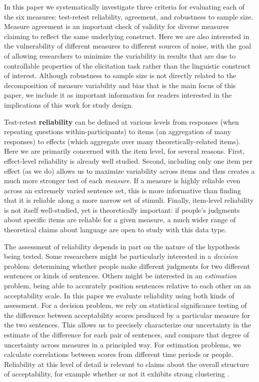\documentclass[doc]{apa6}
\begin{document}
In this paper we systematically investigate three criteria for evaluating each of the six measures: test-retest reliability, agreement, and robustness to sample size. Measure agreement is an important check of validity for diverse measures claiming to reflect the same underlying construct. Here we are also interested in the vulnerability of different measures to different sources of noise, with the goal of allowing researchers to minimize the variability in results that are due to controllable properties of the elicitation task rather than the linguistic construct of interest. Although robustness to sample size is not directly related to the decomposition of measure variability and bias that is the main focus of this paper, we include it as important information for readers interested in the implications of this work for study design.

Test-retest {\bf reliability} can be defined at various levels from responses (when repeating questions within-participants) to items (an aggregation of many responses) to  effects (which  aggregate over many theoretically-related items). Here we are primarily concerned with the item level, for several reasons. First, effect-level reliability is already well studied. Second, including only one item per effect (as we do) allows us to maximize variability across items and thus creates a much more stronger test of each {\it measure}. If a measure is highly reliable even across an extremely varied sentence set, this is more informative than finding that it is reliable along a more narrow set of stimuli. Finally, item-level reliability is not itself well-studied, yet is theoretically important: if people's judgments about specific items are reliable for a given measure, a much wider range of theoretical claims about language are open to study with this data type.

The assessment of reliability depends in part on the nature of the hypothesis being tested. Some researchers might be particularly interested in a {\it decision} problem: determining whether people make different judgments for two different sentences or kinds of sentences. Others might be interested in an {\it estimation} problem, being able to accurately position sentences relative to each other on an acceptability scale. In this paper we evaluate reliability using both kinds of assessment. For a decision problem, we rely on statistical significance testing of the difference between acceptability scores produced by a particular measure for the two sentences. This allows us to precisely characterize our uncertainty in the estimate of the difference for each pair of sentences, and compare that degree of uncertainty across measures in a principled way. For estimation problems, we calculate correlations between scores from different time periods or people. Reliability at this level of detail is relevant to claims about the overall structure of acceptability, for example whether or not it exhibits strong clustering \citep{sprouse2007continuouscategorical}.
\end{document}
